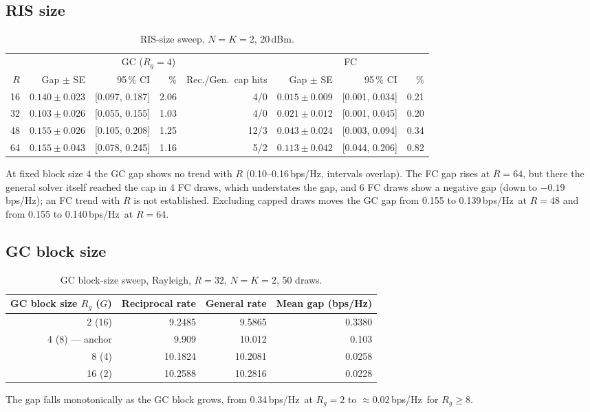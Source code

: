 \documentclass[10pt,a4paper]{article}
\newcommand{\bpsHz}{bps/Hz}
\begin{document}
\subsection{RIS size}
\begin{table}[H]\centering\small
\begin{tabular}{@{}rrrrrrrr@{}}\toprule
 & \multicolumn{4}{c}{GC ($R_g{=}4$)} & \multicolumn{3}{c}{FC}\\\cmidrule(lr){2-5}\cmidrule(lr){6-8}
$R$ & Gap $\pm$ SE & 95\,\% CI & \% & Rec./Gen.\ cap hits & Gap $\pm$ SE & 95\,\% CI & \%\\\midrule
16 & $0.140\pm0.023$ & [0.097, 0.187] & 2.06 & 4/0 & $0.015\pm0.009$ & [0.001, 0.034] & 0.21\\
32 & $0.103\pm0.026$ & [0.055, 0.155] & 1.03 & 4/0 & $0.021\pm0.012$ & [0.001, 0.045] & 0.20\\
48 & $0.155\pm0.026$ & [0.105, 0.208] & 1.25 & 12/3 & $0.043\pm0.024$ & [0.003, 0.094] & 0.34\\
64 & $0.155\pm0.043$ & [0.078, 0.245] & 1.16 & 5/2 & $0.113\pm0.042$ & [0.044, 0.206] & 0.82\\\bottomrule
\end{tabular}
\caption{RIS-size sweep, $N{=}K{=}2$, 20\,dBm.}
\end{table}
At fixed block size 4 the GC gap shows no trend with $R$ (0.10--0.16\,\bpsHz, intervals overlap). The FC gap rises at $R{=}64$, but there the general solver itself reached the cap in 4 FC draws, which understates the gap, and 6 FC draws show a negative gap (down to $-0.19$\,\bpsHz); an FC trend with $R$ is not established. Excluding capped draws moves the GC gap from 0.155 to 0.139\,\bpsHz\ at $R{=}48$ and from 0.155 to 0.140\,\bpsHz\ at $R{=}64$.

\subsection{GC block size}
\begin{table}[H]\centering\small
\begin{tabular}{@{}rrrr@{}}\toprule
GC block size $R_g$ ($G$) & Reciprocal rate & General rate & Mean gap (\bpsHz)\\\midrule
2 (16) & 9.2485 & 9.5865 & 0.3380\\
4 (8) --- anchor & 9.909 & 10.012 & 0.103\\
8 (4) & 10.1824 & 10.2081 & 0.0258\\
16 (2) & 10.2588 & 10.2816 & 0.0228\\\bottomrule
\end{tabular}
\caption{GC block-size sweep, Rayleigh, $R{=}32$, $N{=}K{=}2$, 50 draws.}
\end{table}
The gap falls monotonically as the GC block grows, from 0.34\,\bpsHz\ at $R_g=2$ to $\approx0.02$\,\bpsHz\ for $R_g\ge8$.
\end{document}
